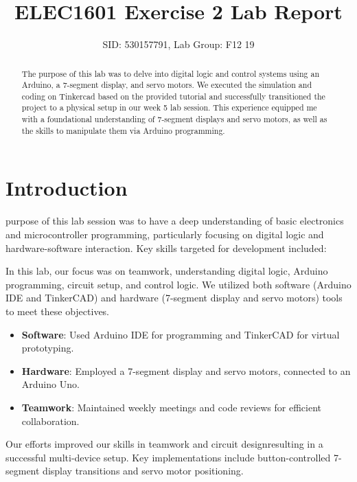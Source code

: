 \documentclass[journal]{IEEEtran}
\begin{document}
\title{ELEC1601 Exercise 2 Lab Report}

\author{SID: 530157791, Lab Group: F12 19}

\maketitle


\begin{abstract}
The purpose of this lab was to delve into digital logic and control systems using an Arduino, a 7-segment display, and servo motors. We executed the simulation and coding on Tinkercad based on the provided tutorial and successfully transitioned the project to a physical setup in our week 5 lab session. This experience equipped me with a foundational understanding of 7-segment displays and servo motors, as well as the skills to manipulate them via Arduino programming.
\end{abstract}

\section{Introduction}
 purpose of this lab session was to have a deep understanding of basic electronics and microcontroller programming, particularly focusing on digital logic and hardware-software interaction. Key skills targeted for development included:

In this lab, our focus was on teamwork, understanding digital logic, Arduino programming, circuit setup, and control logic. We utilized both software (Arduino IDE and TinkerCAD) and hardware (7-segment display and servo motors) tools to meet these objectives.

\begin{itemize}
\item  \textbf{Software}: Used Arduino IDE for programming and TinkerCAD for virtual prototyping.
\item  \textbf{Hardware}: Employed a 7-segment display and servo motors, connected to an Arduino Uno.
\item  \textbf{Teamwork}: Maintained weekly meetings and code reviews for efficient collaboration.
\end{itemize}

Our efforts improved our skills in teamwork and circuit designresulting in a successful multi-device setup. Key implementations include button-controlled 7-segment display transitions and servo motor positioning.
\end{document}
